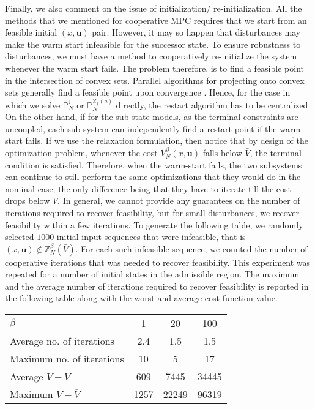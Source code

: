 \documentclass[10pt, twocolumn]{article}
\newcommand{\bu}{\mathbf{u}}
\theoremstyle{definition}
\begin{document}
Finally, we also comment on the issue of initialization/
re-initialization. All the methods that we mentioned for cooperative
MPC requires that we start from an feasible initial $(x,\bu)$
pair. However, it may so happen that disturbances may make the warm
start infeasible for the successor state.  To ensure robustness to
disturbances, we must have a method to cooperatively  re-initialize the system
whenever the warm start fails. The problem therefore, is to find a
feasible point in the intersection of convex sets. Parallel algorithms
for projecting onto convex sets generally find a feasible point upon
convergence \citep{bauschke:borwein:1996}. Hence, for the case in which we solve
$\mathbb{P}_N^{\mathbb{F}}$ or $\mathbb{P}_N^{\mathbb{X}_f(a)}$
directly, the restart algorithm has to be centralized. On the other
hand, if for the sub-state models, as the terminal constraints are
uncoupled, each sub-system can independently find a restart point if
the warm start fails. If we use the relaxation formulation, then
notice that by design of the optimization problem, whenever the cost
$V_N^\beta(x,\bu)$ falls below $\bar{V}$, the terminal condition is
satisfied. Therefore, when the warm-start fails, the two subsystems
can continue to still perform the same optimizations that they would
do in the nominal case; the only difference being that they have to
iterate till the cost drops below $\bar{V}$. In general, we cannot
provide any guarantees on the number of iterations required to recover
feasibility, but for small disturbances, we recover feasibility within
a few iterations. To generate the following table, we randomly
selected  $1000$  initial input sequences that were infeasible, that
is $(x,\bu) \notin \mathbb{Z}_N^{\beta}(\bar{V})$. For each such
infeasible sequence, we counted the number of cooperative iterations
that was needed to recover feasibility. This experiment was repeated
for a number of initial states in the admissible region. The maximum
and the average number of iterations required to recover feasibility
is reported in the following table along with the worst and average
cost function value.
\begin{table}
\label{tab:recovery}
\begin{center}
\begin{tabular}{p{}|ccc}
 \hline
 $\beta$& 1 & 20& 100 \\
 Average no. of iterations & 2.4&1.5&1.5\\
 Maximum no. of iterations & 10 & 5 & 17\\
 Average $V-\bar{V}$ & 609&7445&34445 \\
 Maximum $V-\bar{V}$& 1257&22249&96319 \\
 \hline
\end{tabular}
\end{center}
\end{table}
\end{document}
